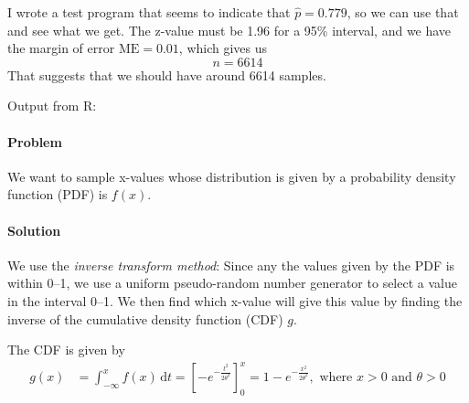\documentclass[a4paper,english,12pt]{article}
\begin{document}
I wrote a test program that seems to indicate that $\hat{p} = 0.779$, so we can
use that and see what we get.  The z-value must be 1.96 for a 95\%{} interval,
and we have the margin of error $\text{ME} = 0.01$, which gives us
\[
  n = 6614
\]
That suggests that we should have around 6614 samples.

Output from R:

\paragraph{Problem} We want to sample x-values whose distribution is given by a
probability density function (PDF) is $f(x)$.
\paragraph{Solution} We use the \textit{inverse transform method}: Since any
the values given by the PDF is within 0--1, we use a uniform pseudo-random
number generator to select a value in the interval 0--1. We then find which
x-value will give this value by finding the inverse of the cumulative density
function (CDF) $g$.

The CDF is given by
\begin{align*}
  g(x) & = \int_{-\infty}^{x} f(x)\, \mathrm{d}t 
     = \left[ -e^{-\frac{t^2}{2\theta^2}} \right]_0^{x} = 
     1 - e^{-\frac{x^2}{2\theta^2}}, \text{ where } x>0 \text{ and } \theta > 0
\end{align*}




\end{document}
